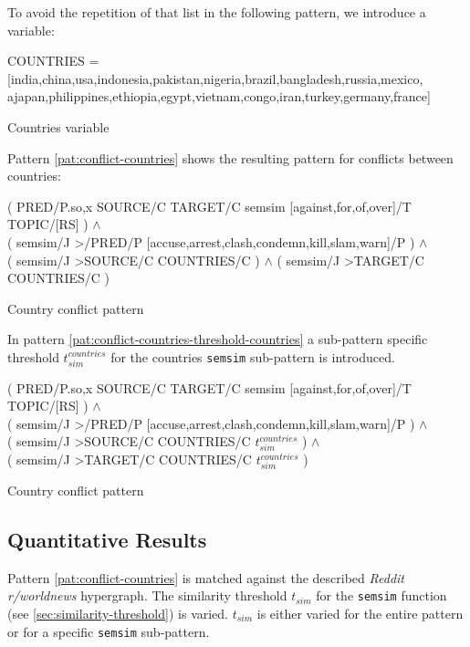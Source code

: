 \documentclass[11pt]{scrreprt}
\begin{document}
To avoid the repetition of that list in the following pattern, we introduce a variable:

\begin{pattern}
  \normalfont\sffamily
  \centering
  COUNTRIES = [india,china,usa,indonesia,pakistan,nigeria,brazil,bangladesh,russia,mexico, ajapan,philippines,ethiopia,egypt,vietnam,congo,iran,turkey,germany,france]
  \caption{Countries variable}
  \label{pat:countries-var}
\end{pattern}

Pattern \ref{pat:conflict-countries} shows the resulting pattern for conflicts between countries:

\begin{pattern}
  \normalfont\sffamily
  \centering
  ( PRED/P.{so,x} SOURCE/C TARGET/C semsim [against,for,of,over]/T TOPIC/[RS] ) \(\wedge\) \\ 
  ( semsim/J >/PRED/P [accuse,arrest,clash,condemn,kill,slam,warn]/P ) \(\wedge\) \\
  ( semsim/J >SOURCE/C COUNTRIES/C ) \(\wedge\) ( semsim/J >TARGET/C COUNTRIES/C )
  \caption{Country conflict pattern}
  \label{pat:conflict-countries}
\end{pattern}

In pattern \ref{pat:conflict-countries-threshold-countries} a sub-pattern specific threshold \(t_{sim}^{countries}\) for the countries \texttt{semsim} sub-pattern is introduced.

\begin{pattern}
  \normalfont\sffamily
  \centering
  ( PRED/P.{so,x} SOURCE/C TARGET/C semsim [against,for,of,over]/T TOPIC/[RS] ) \(\wedge\) \\ 
  ( semsim/J >/PRED/P [accuse,arrest,clash,condemn,kill,slam,warn]/P ) \(\wedge\) \\
  ( semsim/J >SOURCE/C COUNTRIES/C \(t_{sim}^{countries}\) ) \(\wedge\) \\ 
  ( semsim/J >TARGET/C COUNTRIES/C \(t_{sim}^{countries}\) )
  \caption{Country conflict pattern}
  \label{pat:conflict-countries-threshold-countries}
\end{pattern}


\subsection{Quantitative Results}



Pattern \ref{pat:conflict-countries} is matched against the described \textit{Reddit r/worldnews} hypergraph. The similarity threshold  \(t_{sim}\) for the \texttt{semsim} function (see \ref{sec:similarity-threshold}) is varied. \(t_{sim}\) is either varied for the entire pattern or for a specific \texttt{semsim} sub-pattern. 
\end{document}
